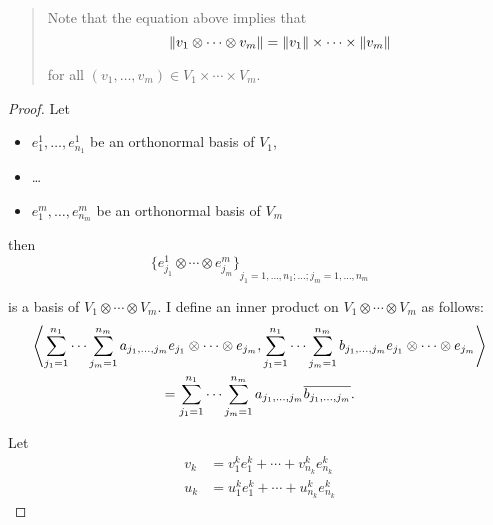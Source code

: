 \begin{quote}
    Note that the equation above implies that
    \[
        \left\Vert{v_{1}\otimes \cdots\otimes v_{m}}\right\Vert = \left\Vert{v_{1}}\right\Vert\times\cdots\times\left\Vert{v_{m}}\right\Vert
    \]

    for all $(v_{1}, \ldots, v_{m})\in V_{1}\times\cdots\times V_{m}$.
\end{quote}

\begin{proof}
    Let
    \begin{itemize}
        \item $e_{1}^{1}, \ldots, e_{n_{1}}^{1}$ be an orthonormal basis of $V_{1}$,
        \item \ldots
        \item $e_{1}^{m}, \ldots, e_{n_{m}}^{m}$ be an orthonormal basis of $V_{m}$
    \end{itemize}

    then
    \[
        {\{ e_{j_{1}}^{1}\otimes \cdots \otimes e_{j_{m}}^{m} \}}_{j_{1}=1,\ldots,n_{1}; \ldots; j_{m}=1,\ldots,n_{m}}
    \]

    is a basis of $V_{1}\otimes\cdots \otimes V_{m}$. I define an inner product on $V_{1}\otimes \cdots \otimes V_{m}$ as follows:
    \begin{multline*}
        \left\langle{\sum^{n_{1}}_{j_{1}=1}\cdots\sum^{n_{m}}_{j_{m}=1}a_{j_{1},\ldots,j_{m}}e_{j_{1}}\otimes\cdots\otimes e_{j_{m}}, \sum^{n_{1}}_{j_{1}=1}\cdots\sum^{n_{m}}_{j_{m}=1}b_{j_{1},\ldots,j_{m}}e_{j_{1}}\otimes\cdots\otimes e_{j_{m}}}\right\rangle \\
        = \sum^{n_{1}}_{j_{1}=1}\cdots\sum^{n_{m}}_{j_{m}=1}a_{j_{1},\ldots,j_{m}}\overline{b_{j_{1},\ldots,j_{m}}}.
    \end{multline*}

    Let
    \begin{align*}
        v_{k} & = v_{1}^{k}e_{1}^{k} + \cdots + v_{n_{k}}^{k}e_{n_{k}}^{k} \\
        u_{k} & = u_{1}^{k}e_{1}^{k} + \cdots + u_{n_{k}}^{k}e_{n_{k}}^{k}
    \end{align*}


\end{proof}
